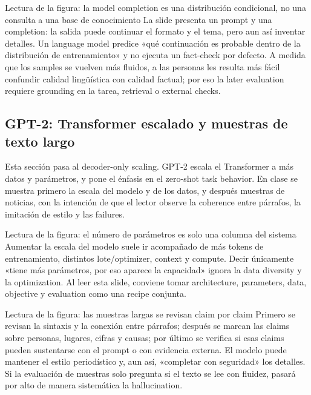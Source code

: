 \begin{knowledgebox}{Lectura de la figura: la model completion es una distribución condicional, no una consulta a una base de conocimiento}
La slide presenta un prompt y una completion: la salida puede continuar el formato y el tema, pero aun así inventar detalles. Un language model predice «qué continuación es probable dentro de la distribución de entrenamiento» y no ejecuta un fact-check por defecto. A medida que los samples se vuelven más fluidos, a las personas les resulta más fácil confundir calidad lingüística con calidad factual; por eso la later evaluation requiere grounding en la tarea, retrieval o external checks.
\end{knowledgebox}

\subsection{GPT-2: Transformer escalado y muestras de texto largo}

Esta sección pasa al decoder-only scaling. GPT-2 escala el Transformer a más datos y parámetros, y pone el énfasis en el zero-shot task behavior. En clase se muestra primero la escala del modelo y de los datos, y después muestras de noticias, con la intención de que el lector observe la coherence entre párrafos, la imitación de estilo y las failures.


\begin{knowledgebox}{Lectura de la figura: el número de parámetros es solo una columna del sistema}
Aumentar la escala del modelo suele ir acompañado de más tokens de entrenamiento, distintos lote/optimizer, context y compute. Decir únicamente «tiene más parámetros, por eso aparece la capacidad» ignora la data diversity y la optimization. Al leer esta slide, conviene tomar architecture, parameters, data, objective y evaluation como una recipe conjunta.
\end{knowledgebox}


\begin{knowledgebox}{Lectura de la figura: las muestras largas se revisan claim por claim}
Primero se revisan la sintaxis y la conexión entre párrafos; después se marcan las claims sobre personas, lugares, cifras y causas; por último se verifica si esas claims pueden sustentarse con el prompt o con evidencia externa. El modelo puede mantener el estilo periodístico y, aun así, «completar con seguridad» los detalles. Si la evaluación de muestras solo pregunta si el texto se lee con fluidez, pasará por alto de manera sistemática la hallucination.
\end{knowledgebox}

